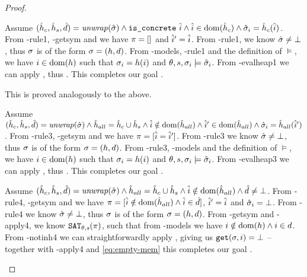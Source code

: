 \begin{proof}
\begin{hypvlist}
 Assume $(\hat{h}_c,\hat{h}_s,\hat{d})=\mathit{unwrap}(\hat{\sigma}) \land \texttt{is\_concrete}~\hat{i} \land \hat{i}\in\operatorname{dom}(\hat{h}_c) \land \hat{\sigma}_{i}=\hat{h}_c(\hat{i})$.
 From \hyp{rule1}, \hyp{getsym} and  we have $\pi=[]$ and $\hat{i}'=\hat{i}$.
 From \hyp{rule1}, we know $\hat{\sigma}\neq\bot$, thus $\sigma$ is of the form $\sigma=(h,d)$.%
 From \hyp{models}, \hyp{rule1} and the definition of $\models$, we have $i\in \operatorname{dom}(h)$ such that $\sigma_i=h(i)$ and ${\theta,s,\sigma_i\models\hat{\sigma}_i}$.%
 From \hyp{evalheap1} we can apply , thus . This completes our goal .
\end{hypvlist}

 This is proved analogously to the above.


\begin{hypvlist}
 Assume $(\hat{h}_c,\hat{h}_s,\hat{d})=\mathit{unwrap}(\hat{\sigma}) \land \hat{h}_{all}=\hat{h}_c\cup \hat{h}_s \land \hat{i}\notin \operatorname{dom}(\hat{h}_{all}) \land \hat{i}'\in\operatorname{dom}(\hat{h}_{all}) \land {\hat{\sigma}_i=\hat{h}_{all}(\hat{i}')}$.
 From \hyp{rule3}, \hyp{getsym} and  we have $\pi=[\hat{i} = \hat{i}']$.
 From \hyp{rule3} we know $\hat{\sigma}\neq\bot$, thus $\sigma$ is of the form $\sigma=(h,d)$.
 From \hyp{rule3}, \hyp{models} and the definition of $\models$, we have $i\in \operatorname{dom}(h)$  such that $\sigma_i=h(i)$ and ${\theta,s,\sigma_i\models\hat{\sigma}_i}$.%
 From \hyp{evalheap3} we can apply , thus . This completes our goal .
\end{hypvlist}


\begin{hypvlist}
 Assume $(\hat{h}_c,\hat{h}_s,\hat{d})=\mathit{unwrap}(\hat{\sigma}) \land \hat{h}_{all}=\hat{h}_c\cup \hat{h}_s \land \hat{i}\notin\operatorname{dom}(\hat{h}_{all}) \land \hat{d}\neq\bot$.
 From \hyp{rule4}, \hyp{getsym} and  we have $\pi=[\hat{i}\notin\operatorname{dom}(\hat{h}_{all}) \land \hat{i}\in \hat{d}]$, $\hat{i}'=\hat{i}$ and $\hat{\sigma}_i=\bot$.%
 From \hyp{rule4} we know $\hat{\sigma}\neq\bot$, thus $\sigma$ is of the form $\sigma=(h,d)$.
 From \hyp{getsym} and \hyp{apply4}, we know $\texttt{SAT}_{\mathit{\theta,s}}(\pi)$, such that from \hyp{models} we have ${i\notin \operatorname{dom}(h)} \land {i\in d}$.
 From \hyp{notinh4} we can straightforwardly apply , giving us $\texttt{get}(\sigma,i)=\bot$ -- together with \hyp{apply4} and \ref{eq:empty-mem} this completes our goal .
\end{hypvlist}


\end{proof}
